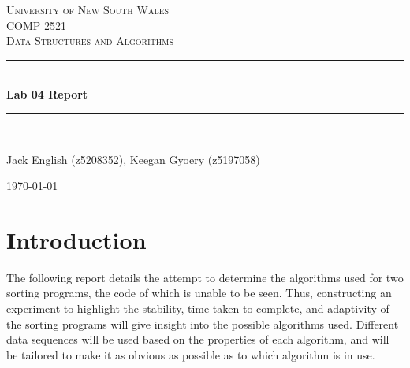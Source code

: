 \documentclass[a4paper]{article}
\begin{document}
\newlength{\strutheight}
\settoheight{\strutheight}{\strut}

\begin{titlepage}

\newcommand{\HRule}{\rule{\linewidth}{0.5mm}} %

\center %
 
\textsc{\LARGE University of New South Wales}\\[1.5cm] %
\textsc{\Large COMP 2521}\\[0.5cm] %
\textsc{\large Data Structures and Algorithms}\\[0.5cm] %

\HRule \\[0.4cm]
{ \huge \bfseries Lab 04 Report}\\[0.4cm] %
\HRule \\[1.5cm]


\begin{center} \large
Jack English (z5208352), Keegan Gyoery (z5197058)%
\\
\end{center}


\vspace{4cm}

{\today}\\[3cm] %

\vfill %

\end{titlepage}


\tableofcontents
\listoftables

\pagebreak

\section{Introduction}
The following report details the attempt to determine the algorithms used for two sorting programs, the code of which is unable to be seen. Thus, constructing an experiment to highlight the stability, time taken to complete, and adaptivity of the sorting programs will give insight into the possible algorithms used. Different data sequences will be used based on the properties of each algorithm, and will be tailored to make it as obvious as possible as to which algorithm is in use.
\end{document}
